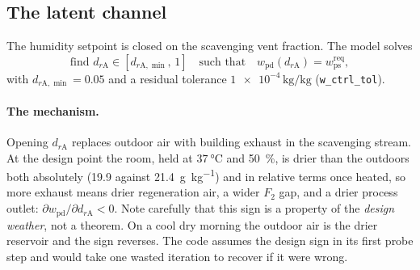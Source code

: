 \subsection{The latent channel}
\label{sec:air:latent}

The humidity setpoint is closed on the scavenging vent fraction. The model
solves
\begin{equation}
\text{find } d_{r\mathrm{A}} \in [d_{r\mathrm{A},\min},\,1]
\quad\text{such that}\quad
w_{\mathrm{pd}}\!\left(d_{r\mathrm{A}}\right)
= w_{\mathrm{ps}}^{\mathrm{req}} ,
\label{eq:air:rA_solve}
\end{equation}
with $d_{r\mathrm{A},\min}=\num{0.05}$ and a residual tolerance
$\num{1e-4}\,\si{\kilogram\per\kilogram}$ (\texttt{w\_ctrl\_tol}).

\paragraph{The mechanism.} Opening $d_{r\mathrm{A}}$ replaces outdoor air with
building exhaust in the scavenging stream. At the design point the room, held
at $\SI{37}{\celsius}$ and \SI{50}{\percent}, is drier than the outdoors both
absolutely (\num{19.9} against \SI{21.4}{\gram\per\kilogram}) and in relative
terms once heated, so more exhaust means drier regeneration air, a wider $F_2$
gap, and a drier process outlet: $\partial w_{\mathrm{pd}}/\partial
d_{r\mathrm{A}}<0$. Note carefully that this sign is a property of the
\emph{design weather}, not a theorem. On a cool dry morning the outdoor air is
the drier reservoir and the sign reverses. The code assumes the design sign in
its first probe step and would take one wasted iteration to recover if it were
wrong.

